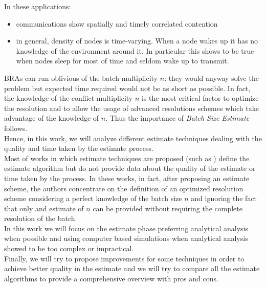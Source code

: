 \documentclass[12pt,a4paper]{report}
\begin{document}
In these applications:
\begin{itemize}
\item communications show spatially and timely correlated contention
\item in general, density of nodes is time-varying. When a node wakes up it has no knowledge of the environment around it. In particular this shows to be true when nodes sleep for most of time and seldom wake up to transmit.
\end{itemize}
 
BRAs can run oblivious of the batch multiplicity $n$: they would anyway solve the problem but expected time required would not be as short as possible. In fact, the knowledge of the conflict multiplicity $n$ is the most critical factor to optimize the resolution and to allow the usage of advanced resolutions schemes which take advantage of the knowledge of $n$. Thus the importance of \emph{Batch Size Estimate} follows.\\

Hence, in this work, we will analyze different estimate techniques dealing with the quality and time taken by the estimate process.\\
Most of works in which estimate techniques are proposed (such as \cite{cidon,greenberg87}) define the estimate  algorithm but do not provide data about the quality of the estimate or time taken by the process. In these works, in fact, after proposing an estimate scheme, the authors concentrate on the definition of an optimized resolution scheme considering a perfect knowledge of the batch size $n$ and ignoring the fact that only and estimate of $n$ can be provided without requiring the complete resolution of the batch.\\
In this work we will focus on the estimate phase preferring analytical analysis when possible and using computer based simulations when analytical analysis showed to be too complex or impractical.\\
Finally, we will try to propose improvements for some techniques in order to achieve better quality in the estimate and we will try to compare all the estimate algorithms to provide a comprehensive overview with pros and cons. 

\end{document}
